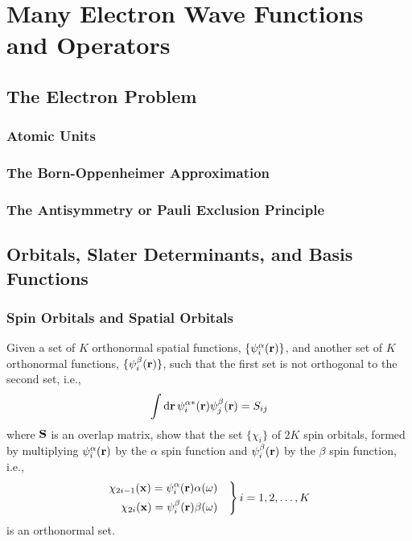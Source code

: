 \documentclass[a4paper]{book}
\newcounter{exercise}[chapter]
\newcommand*{\dif}{\mathop{}\!\mathrm{d}}
\newcommand{\bfr}{{\bf r}}
\newcommand{\bfx}{{\bf x}}
\begin{document}

	\chapter{Many Electron Wave Functions and Operators}
	
	\section{The Electron Problem}
	
	\subsection{Atomic Units}
	
	\subsection{The Born-Oppenheimer Approximation}
	
	\subsection{The Antisymmetry or Pauli Exclusion Principle}
	
	\section{Orbitals, Slater Determinants, and Basis Functions}
	
	\subsection{Spin Orbitals and Spatial Orbitals}
	
	\begin{exercise}
	Given a set of $K$ orthonormal spatial functions, $\{\psi^\alpha_i(\bfr)\}$, and another set of $K$ orthonormal functions, $\{\psi^\beta_i(\bfr)\}$, such that the first set is not orthogonal to the second set, i.e., 
	\[
		\int \dif \bfr \, \psi^{\alpha*}_i( \bfr ) \psi^\beta_j( \bfr ) = S_{ij}
	\]
	where ${\bf S}$ is an overlap matrix, show that the set $\{ \chi_i \}$ of $2K$ spin orbitals, formed by multiplying $\psi^\alpha_i( \bfr )$ by the $\alpha$ spin function and $\psi^\beta_i( \bfr )$ by the $\beta$ spin function, i.e.,
	\[ \left.
	\begin{rgathered}
		\chi_{2i-1}(\bfx) = \psi^\alpha_i( \bfr ) \alpha( \omega ) \quad \\
		\chi_{2i}(\bfx) = \psi^\beta_i( \bfr ) \beta( \omega ) \quad
	\end{rgathered} \right\} i = 1, 2, \ldots, K
	\]
	is an orthonormal set.
	\end{exercise}
	
\end{document}

